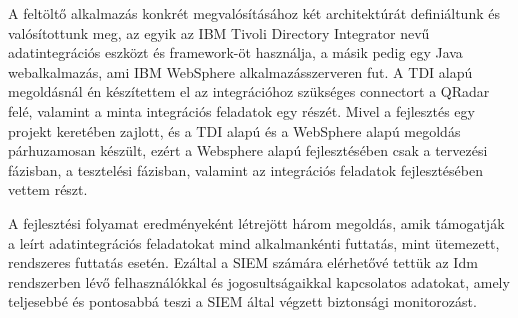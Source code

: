 A feltöltő alkalmazás konkrét megvalósításához két architektúrát definiáltunk és valósítottunk meg, az egyik az IBM Tivoli Directory Integrator nevű adatintegrációs eszközt és framework-öt használja, a másik pedig egy Java webalkalmazás, ami IBM WebSphere alkalmazásszerveren fut. A TDI alapú megoldásnál én készítettem el az integrációhoz szükséges connectort a QRadar felé, valamint a minta integrációs feladatok egy részét.  Mivel a fejlesztés egy projekt keretében zajlott, és a TDI alapú és a WebSphere alapú megoldás párhuzamosan készült, ezért a Websphere alapú fejlesztésében csak a tervezési fázisban, a tesztelési fázisban, valamint az integrációs feladatok fejlesztésében vettem részt.

A fejlesztési folyamat eredményeként létrejött három megoldás, amik támogatják a leírt adatintegrációs feladatokat mind alkalmankénti futtatás, mint ütemezett, rendszeres futtatás esetén. Ezáltal a SIEM számára elérhetővé tettük az Idm rendszerben lévő felhasználókkal és jogosultságaikkal kapcsolatos adatokat, amely teljesebbé és pontosabbá teszi a SIEM által végzett biztonsági monitorozást.

